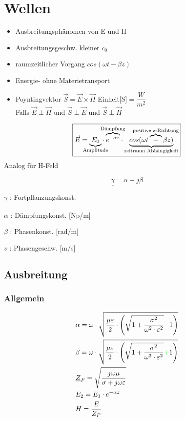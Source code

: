 \section{Wellen}
\begin{itemize}
    \setlength\itemsep{1pt}
    \item Ausbreitungsphänomen von E und H
    \item Ausbreitungsgeschw. kleiner $c_0$
    \item raumzeitlicher Vorgang $cos(\omega t- \beta z)$
    \item Energie- ohne Materietransport
    \item Poyntingvektor $\vec{S}=\vec{E}\times\vec{H}$ Einheit[S]$= \dfrac{W}{m^2}$\\
          Falls $\vec{E}\perp\vec{H}$ und $\vec{S}\perp\vec{E}$ und $\vec{S}\perp\vec{H}$
\end{itemize}

\[\boxed{\vec{E} = \underbrace{E_0}_{\mathclap{\text{Amplitude}}}
            \cdot \overbrace{e^{-\alpha z}}^{\mathclap{\text{Dämpfung}}}
            \cdot \underbrace{cos(\omega t \overbrace{-}^{\mathclap{\text{positive z-Richtung}}} \beta z)}_\text{zeitraum Abhängigkeit}}\]
            {\footnotesize Analog für H-Feld}

\[\boxed{\underline{\gamma}=\alpha+j\beta}\]


$\underline{\gamma}$ : Fortpflanzungskonst.

$\alpha$ : Dämpfungskonst. [Np/m]

$\beta$ : Phasenkonst. [rad/m]

$v$ : Phasengeschw. [m/s]

\subsection{Ausbreitung}
\subsubsection{Allgemein}
\begin{align*}
     & \alpha = \omega \cdot \sqrt{\dfrac{\mu \varepsilon}{2}\cdot \left(\sqrt{1+\dfrac{\sigma^2}{\omega^2\cdot\varepsilon^2}}{\color{red}{-}}1\right)} \\
     & \beta  = \omega \cdot \sqrt{\dfrac{\mu \varepsilon}{2}\cdot \left(\sqrt{1+\dfrac{\sigma^2}{\omega^2\cdot\varepsilon^2}}{\color{green}{+}}1\right)} \\
     & \underline{Z}_F = \sqrt{\dfrac{j\omega\mu}{\sigma+j\omega\varepsilon}}                                                            \\
     & E_2 = E_1 \cdot e^{-\alpha z}                                                                                                     \\
     & H = \dfrac{E}{Z_F}
\end{align*}

